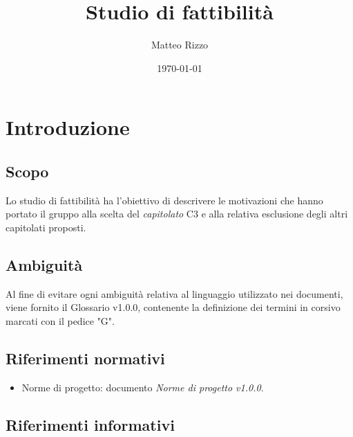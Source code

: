 \documentclass[openany,12pt,a4paper]{report}
\title{Studio di fattibilità}
\author{Matteo Rizzo}
\date{\today}
\begin{document}
\maketitle

 
\tableofcontents{}


\chapter{Introduzione}

\section{Scopo}

Lo studio di fattibilità ha l’obiettivo di descrivere le motivazioni che hanno portato
il gruppo alla scelta del  \textit{capitolato} C3 e alla relativa esclusione degli altri
capitolati proposti.

\section{Ambiguità}

Al fine di evitare ogni ambiguità relativa al linguaggio utilizzato nei documenti, viene
fornito il Glossario v1.0.0, contenente la definizione dei termini in corsivo marcati con
il pedice "G".

\section{Riferimenti normativi}

\begin{itemize}

    \item{Norme di progetto:} documento \textit{Norme di progetto v1.0.0}.

\end{itemize}

\section{Riferimenti informativi}
\end{document}
